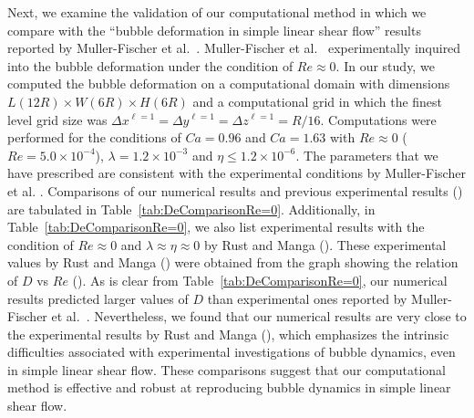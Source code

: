 \documentclass[%
 reprint,
 showkeys,
 amsmath,amssymb,
 aps,
 prfluids,
 onecolumn
]{revtex4-2}
\newcommand{\lwh}[3]{L(#1R)\times W(#2R) \times H(#3R)}
\begin{document}

{\color{blue} Next, we examine the validation of our 
computational method in which
we compare with the ``bubble deformation in simple linear shear flow'' 
results reported by
Muller-Fischer et al.~\cite{MulTobDreFisWin08}.  Muller-Fischer et
al.~\cite{MulTobDreFisWin08} experimentally inquired into the bubble
deformation under the condition of $Re \approx 0$. 
In our study, we computed
the bubble deformation on a 
computational domain with dimensions
$\lwh{12}{6}{6}$ and a computational grid in which the finest level grid 
size was
$\Delta x^{\ell=1} = \Delta y^{\ell=1} = \Delta z^{\ell=1} = R/16$.
Computations were
performed for the conditions of $Ca = 0.96$ and $Ca = 1.63$ 
with $Re \approx 0$ ($Re = 5.0 \times 10^{-4}$),  
$\lambda = 1.2 \times 10^{-3}$ and  
$\eta \leq 1.2 \times 10^{-6}$.
The parameters that we have prescribed are consistent with the 
experimental conditions by Muller-Fischer et al.
\cite{MulTobDreFisWin08}.  
Comparisons of our numerical results and previous
experimental results (\cite{MulTobDreFisWin08}) are tabulated in
Table~\ref{tab:DeComparisonRe=0}.  
Additionally, in
Table~\ref{tab:DeComparisonRe=0}, we also list experimental results with the
condition of $Re \approx 0$ and $\lambda \approx \eta \approx 0$ by Rust and
Manga (\cite{RusMan02}). These experimental values by Rust and Manga
(\cite{RusMan02}) were obtained from the graph showing the relation of $D$ vs
$Re$ (\cite{RusMan02}).  As is clear from Table~\ref{tab:DeComparisonRe=0}, our
numerical results predicted larger values of $D$ than experimental ones
reported by Muller-Fischer et al.~\cite{MulTobDreFisWin08}. Nevertheless, we
found that our numerical results are very close to the experimental results by
Rust and Manga (\cite{RusMan02}), which emphasizes the intrinsic difficulties
associated with experimental investigations of bubble dynamics, even in simple
linear shear flow.  These comparisons suggest that our computational method is
effective and robust at reproducing bubble dynamics in simple linear shear
flow.}
\end{document}
